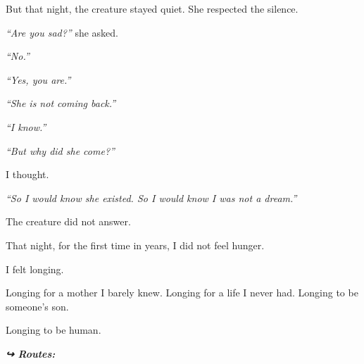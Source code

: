 \noindent But that night, the creature stayed quiet. She respected the silence.

\noindent \textit{\textquotedblleft{}Are you sad?\textquotedblright{}} she asked.

\noindent \textit{\textquotedblleft{}No.\textquotedblright{}}

\noindent \textit{\textquotedblleft{}Yes, you are.\textquotedblright{}}

\noindent \textit{\textquotedblleft{}She is not coming back.\textquotedblright{}}

\noindent \textit{\textquotedblleft{}I know.\textquotedblright{}}

\noindent \textit{\textquotedblleft{}But why did she come?\textquotedblright{}}

\noindent I thought.

\noindent \textit{\textquotedblleft{}So I would know she existed. So I would know I was not a dream.\textquotedblright{}}

\noindent The creature did not answer.

\noindent That night, for the first time in years, I did not feel hunger.

\noindent I felt longing.

\noindent Longing for a mother I barely knew.
Longing for a life I never had.
Longing to be someone's son.

\noindent Longing to be human.

\vspace{0.5em}
\noindent\textit{\textbf{↪ Routes:}  \rotasep {}}

